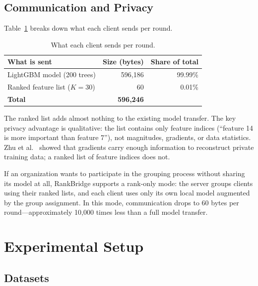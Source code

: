 \documentclass[information,article,submit,pdftex]{mdpi}
\begin{document}
\subsection{Communication and Privacy}

Table~\ref{tab:communication} breaks down what each client sends per round.

\begin{table}[H]
\caption{What each client sends per round.}\label{tab:communication}
\begin{tabular}{lrr}
\toprule
\textbf{What is sent} & \textbf{Size (bytes)} & \textbf{Share of total} \\
\midrule
LightGBM model (200 trees) & 596{,}186 & 99.99\% \\
Ranked feature list ($K=30$) & 60 & 0.01\% \\
\midrule
\textbf{Total} & \textbf{596{,}246} & \\
\bottomrule
\end{tabular}
\end{table}

The ranked list adds almost nothing to the existing model transfer. The key
privacy advantage is qualitative: the list contains only feature indices
(``feature 14 is more important than feature 7''), not magnitudes, gradients, or
data statistics. Zhu et al.~\cite{zhu2019deepleakage} showed that gradients carry
enough information to reconstruct private training data; a ranked list of feature
indices does not.

If an organization wants to participate in the grouping process without sharing
its model at all, RankBridge supports a rank-only mode: the server groups clients
using their ranked lists, and each client uses only its own local model augmented
by the group assignment. In this mode, communication drops to 60 bytes per
round---approximately 10{,}000 times less than a full model transfer.

\section{Experimental Setup}\label{sec:setup}

\subsection{Datasets}
\end{document}
